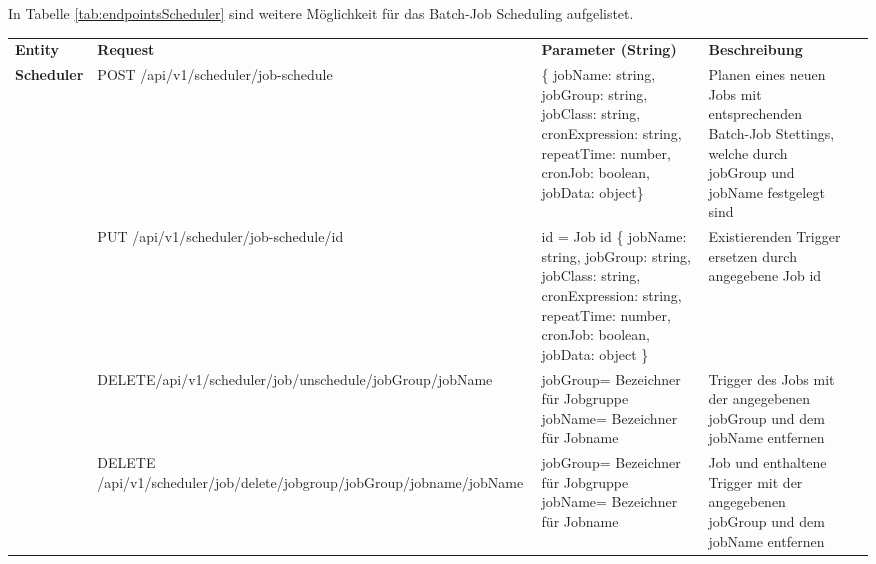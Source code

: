 In Tabelle  \ref{tab:endpointsScheduler} sind weitere Möglichkeit für das Batch-Job Scheduling aufgelistet.
\newpage
\begin{table}[H]
\begin{tabular}{|p{}|p{}|p{}|p{}|l}
\cline{1-4}
       \textbf{Entity}                    & \textbf{Request} & \textbf{Parameter (String)} & \textbf{Beschreibung} &  \\ \cline{1-4}
\multirow{7}{*}{\textbf{Scheduler}} & POST \newline /api/v1/scheduler/job-schedule & \{ 
   jobName: string,\newline
   jobGroup: string,\newline
   jobClass: string,\newline
   cronExpression: string,\newline
   repeatTime: number,\newline
   cronJob: boolean,\newline
   jobData: object\} & Planen eines neuen Jobs mit entsprechenden Batch-Job Stettings, welche durch jobGroup und jobName festgelegt sind &  \\ \cline{2-4}
                  & PUT \newline /api/v1/scheduler/job-schedule/{id}  & id = Job id\newline
\{ jobName: string,\newline
  jobGroup: string,\newline
  jobClass: string,\newline
  cronExpression: string,\newline
  repeatTime: number,\newline
  cronJob: boolean,\newline
  jobData: object 
\}  & Existierenden Trigger ersetzen durch angegebene Job id &  \\ \cline{2-4}
& DELETE\newline /api/v1/scheduler/job/\newline unschedule/{jobGroup}/{jobName}  & jobGroup= Bezeichner für Jobgruppe \newline jobName= Bezeichner für Jobname & Trigger des Jobs mit der angegebenen jobGroup und dem jobName entfernen &  \\ \cline{2-4}
                  & DELETE \newline /api/v1/scheduler/job/delete/\newline jobgroup/{jobGroup}/\newline jobname/{jobName} & jobGroup= Bezeichner für Jobgruppe \newline jobName= Bezeichner für Jobname & Job und enthaltene Trigger mit der angegebenen jobGroup und dem jobName entfernen &  \\ \cline{2-4}

\end{tabular}
\end{table}
